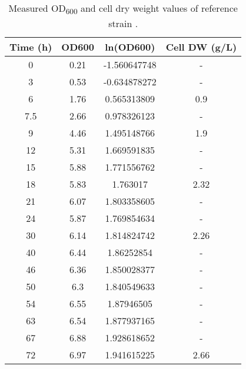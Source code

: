 \begin{table}[H]
\caption[Measured OD\textsubscript{600} and cell dry weight values of reference strain \cite{surmeli2019evolutionary}]{Measured OD\textsubscript{600} and cell dry weight values of reference strain \cite{surmeli2019evolutionary}.}
\begin{center}
  \begin{tabular}{|c|c|c|c|}
 \hline
  \textbf{Time (h)} & \textbf{OD600} & \textbf{ln(OD600)} & \textbf{Cell DW (g/L)} \\
  \hline
  0                 & 0.21           & -1.560647748       & -                      \\
  3                 & 0.53           & -0.634878272       & -                      \\
  6                 & 1.76           & 0.565313809        & 0.9                    \\
  7.5               & 2.66           & 0.978326123        & -                      \\
  9                 & 4.46           & 1.495148766        & 1.9                    \\
  12                & 5.31           & 1.669591835        & -                      \\
  15                & 5.88           & 1.771556762        & -                      \\
  18                & 5.83           & 1.763017           & 2.32                   \\
  21                & 6.07           & 1.803358605        & -                      \\
  24                & 5.87           & 1.769854634        & -                      \\
  30                & 6.14           & 1.814824742        & 2.26                   \\
  40                & 6.44           & 1.86252854         & -                      \\
  46                & 6.36           & 1.850028377        & -                      \\
  50                & 6.3            & 1.840549633        & -                      \\
  54                & 6.55           & 1.87946505         & -                      \\
  63                & 6.54           & 1.877937165        & -                      \\
  67                & 6.88           & 1.928618652        & -                      \\
  72                & 6.97           & 1.941615225        & 2.66                  \\
   \hline
  \end{tabular}
\label{table:experimental_OD600s_and_growths}
\end{center}
\end{table}
